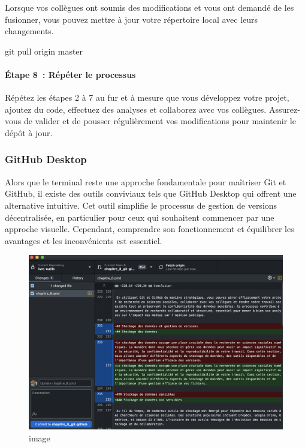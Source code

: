 \documentclass[
  letterpaper,
  DIV=11,
  numbers=noendperiod]{scrreprt}
\let\oldparagraph\paragraph
\renewcommand{\paragraph}[1]{\oldparagraph{#1}\mbox{}}
\newenvironment{Shaded}{\begin{snugshade}}{\end{snugshade}}
\newcommand{\FunctionTok}[1]{\textcolor[rgb]{0.28,0.35,0.67}{#1}}
\newcommand{\NormalTok}[1]{\textcolor[rgb]{0.00,0.23,0.31}{#1}}
\begin{document}
Lorsque vos collègues ont soumis des modifications et vous ont demandé
de les fusionner, vous pouvez mettre à jour votre répertoire local avec
leurs changements.

\begin{Shaded}
\begin{Highlighting}[]
\FunctionTok{git}\NormalTok{ pull origin master}
\end{Highlighting}
\end{Shaded}

\paragraph{Étape 8~: Répéter le
processus}\label{uxe9tape-8-ruxe9puxe9ter-le-processus}

Répétez les étapes 2 à 7 au fur et à mesure que vous développez votre
projet, ajoutez du code, effectuez des analyses et collaborez avec vos
collègues. Assurez-vous de valider et de pousser régulièrement vos
modifications pour maintenir le dépôt à jour.

\subsubsection{GitHub Desktop}\label{github-desktop}

Alors que le terminal reste une approche fondamentale pour maîtriser Git
et GitHub, il existe des outils conviviaux tels que GitHub Desktop qui
offrent une alternative intuitive. Cet outil simplifie le processus de
gestion de versions décentralisée, en particulier pour ceux qui
souhaitent commencer par une approche visuelle. Cependant, comprendre
son fonctionnement et équilibrer les avantages et les inconvénients est
essentiel.

\begin{figure}[H]

{\centering \includegraphics{images/chapitre8_gitdesktop.png}

}

\caption{image}

\end{figure}%
\end{document}

